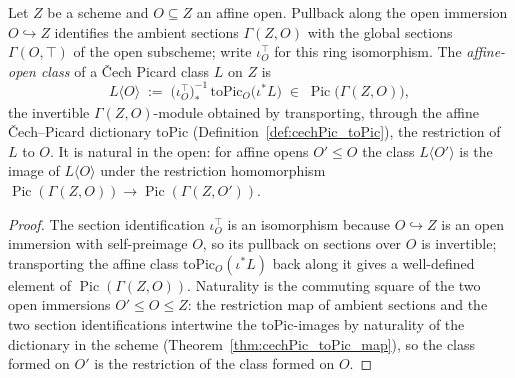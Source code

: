 \begin{definition}
  \label{def:cechPicClass_affineOpen}
  \leanok
  Let \(Z\) be a scheme and \(O \subseteq Z\) an affine open. Pullback along the open immersion \(O
  \hookrightarrow Z\) identifies the ambient sections \(\Gamma(Z, O)\) with the global sections
  \(\Gamma(O, \top)\) of the open subscheme; write \(\iota_O^{\top}\) for this ring isomorphism. The
  \emph{affine-open class} of a \v Cech Picard class \(L\) on \(Z\) is
  \[
    L\langle O\rangle \;:=\; \bigl(\iota_O^{\top}\bigr)^{-1}_{*}\,
      \mathrm{toPic}_O\bigl(\iota^{*}L\bigr) \;\in\; \operatorname{Pic}\bigl(\Gamma(Z, O)\bigr),
  \]
  the invertible \(\Gamma(Z, O)\)-module obtained by transporting, through the affine \v
  Cech--Picard dictionary \(\mathrm{toPic}\) (Definition~\ref{def:cechPic_toPic}), the restriction of
  \(L\) to \(O\). It is natural in the open: for affine opens \(O' \le O\) the class \(L\langle
  O'\rangle\) is the image of \(L\langle O\rangle\) under the restriction homomorphism
  \(\operatorname{Pic}(\Gamma(Z, O)) \to \operatorname{Pic}(\Gamma(Z, O'))\).
\end{definition}
\begin{proof}
  \leanok
  The section identification \(\iota_O^{\top}\) is an isomorphism because \(O \hookrightarrow Z\) is
  an open immersion with self-preimage \(O\), so its pullback on sections over \(O\) is invertible;
  transporting the affine class \(\mathrm{toPic}_O(\iota^{*}L)\) back along it gives a well-defined
  element of \(\operatorname{Pic}(\Gamma(Z, O))\). Naturality is the commuting square of the two open
  immersions \(O' \le O \le Z\): the restriction map of ambient sections and the two section
  identifications intertwine the \(\mathrm{toPic}\)-images by naturality of the dictionary in the
  scheme (Theorem~\ref{thm:cechPic_toPic_map}), so the class formed on \(O'\) is the restriction of
  the class formed on \(O\).
\end{proof}

